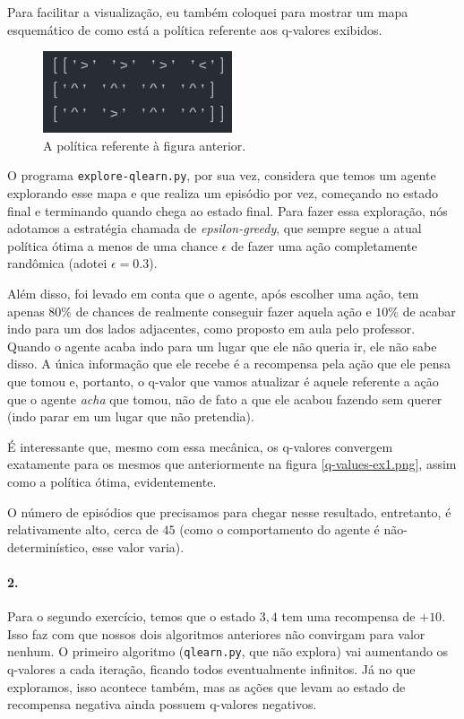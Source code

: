 \documentclass[12pt, a4paper, oneside]{article}
\begin{document}
Para facilitar a visualização, eu também coloquei para mostrar um mapa
esquemático de como está a política referente aos q-valores exibidos.

\begin{figure}[h]
\centering
\includegraphics[scale=0.9]{Res/policy-ex1.png}
\caption{A política referente à figura anterior.}
\label{policy-ex1.png}
\end{figure}

O programa \texttt{explore-qlearn.py}, por sua vez, considera que temos um
agente explorando esse mapa e que realiza um episódio por vez, começando no
estado final e terminando quando chega ao estado final. Para fazer essa
exploração, nós adotamos a estratégia chamada de \textit{epsilon-greedy}, que
sempre segue a atual política ótima a menos de uma chance $\epsilon$ de fazer
uma ação completamente randômica (adotei $\epsilon=0.3$).

Além disso, foi levado em conta que o agente, após escolher uma ação, tem apenas
$80\%$ de chances de realmente conseguir fazer aquela ação e $10\%$ de acabar
indo para um dos lados adjacentes, como proposto em aula pelo professor. Quando
o agente acaba indo para um lugar que ele não queria ir, ele não sabe disso. A
única informação que ele recebe é a recompensa pela ação que ele pensa que tomou
e, portanto, o q-valor que vamos atualizar é aquele referente a ação que o
agente \textit{acha} que tomou, não de fato a que ele acabou fazendo sem querer
(indo parar em um lugar que não pretendia).

É interessante que, mesmo com essa mecânica, os q-valores convergem exatamente
para os mesmos que anteriormente na figura \ref{q-values-ex1.png}, assim como a
política ótima, evidentemente.

O número de episódios que precisamos para chegar nesse resultado, entretanto, é
relativamente alto, cerca de $45$ (como o comportamento do agente é
não-determinístico, esse valor varia).

\paragraph{2.}%
\label{par:2_}

Para o segundo exercício, temos que o estado $3,4$ tem uma recompensa de $+10$.
Isso faz com que nossos dois algoritmos anteriores não convirgam para valor
nenhum. O primeiro algoritmo (\texttt{qlearn.py}, que não explora) vai
aumentando os q-valores a cada iteração, ficando todos eventualmente infinitos.
Já no que exploramos, isso acontece também, mas as ações que levam ao estado de
recompensa negativa ainda possuem q-valores negativos.
\end{document}
